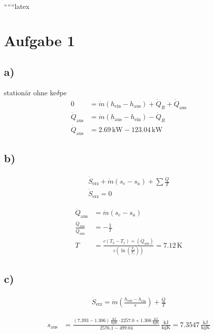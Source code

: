 
``````latex


\section*{Aufgabe 1}

\subsection*{a)}
stationär ohne ke$\delta$pe
\begin{align*}
0 &= \dot{m} (h_{\text{ein}} - h_{\text{aus}}) + \dot{Q}_R + \dot{Q}_{\text{aus}} \\
\dot{Q}_{\text{aus}} &= \dot{m} (h_{\text{aus}} - h_{\text{ein}}) - \dot{Q}_R \\
\dot{Q}_{\text{aus}} &= 2.69 \, \text{kW} - 123.04 \, \text{kW}
\end{align*}

\subsection*{b)}
\begin{align*}
\dot{S}_{\text{erz}} + \dot{m} (s_e - s_a) + \sum \frac{\dot{Q}}{T} \\
\dot{S}_{\text{erz}} = 0
\end{align*}

\begin{align*}
\dot{Q}_{\text{aus}} &= \dot{m} (s_e - s_a) \\
\frac{\dot{Q}_{\text{aus}}}{\dot{Q}_{\text{aus}}} &= -\frac{1}{T} \\
T &= \frac{c (T_2 - T_1) = (\dot{Q}_{\text{aus}})}{c (\ln (\frac{T_2}{T_1}))} = 7.12 \, \text{K}
\end{align*}

\subsection*{c)}
\begin{align*}
\dot{S}_{\text{erz}} = \dot{m} \left( \frac{h_{\text{aus}} - h_{\text{ein}}}{s} \right) + \frac{\dot{Q}}{T}
\end{align*}

\begin{align*}
s_{\text{aus}} &= \frac{(7.393 - 1.306) \, \frac{\text{kJ}}{\text{kgK}} \cdot 2257.0 + 1.306 \, \frac{\text{kJ}}{\text{kgK}}}{2576.1 - 499.04} \, \frac{\text{kJ}}{\text{kgK}} = 7.3547 \, \frac{\text{kJ}}{\text{kgK}}
\end{align*}

